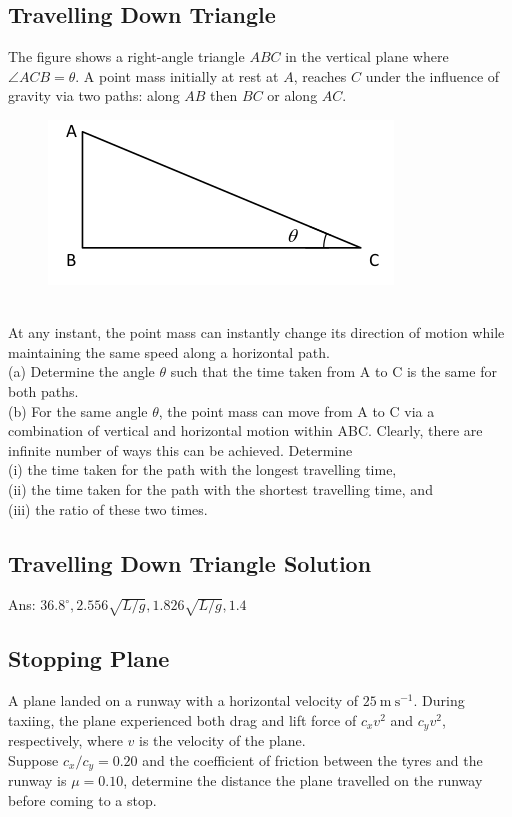\documentclass{article}
\begin{document}
\subsection{Travelling Down Triangle}
The figure shows a right-angle triangle $A B C$ in the vertical plane where $\angle A C B=\theta$. A point mass initially at rest at $A$, reaches $C$ under the influence of gravity via two paths: along $A B$ then $B C$ or along $A C$.\\[10pt]
\begin{figure}[h]
    \centering
\includegraphics[width=0.8\linewidth]{images/travellingdowntriangle.png}
\end{figure}\\
At any instant, the point mass can instantly change its direction of motion while maintaining the same speed along a horizontal path.\\[10pt]
(a) Determine the angle $\theta$ such that the time taken from $\mathrm{A}$ to $\mathrm{C}$ is the same for both paths.\\[5pt]
(b) For the same angle $\theta$, the point mass can move from $\mathrm{A}$ to $\mathrm{C}$ via a combination of vertical and horizontal motion within ABC. Clearly, there are infinite number of ways this can be achieved. Determine\\[5pt]
(i) the time taken for the path with the longest travelling time,\\[5pt]
(ii) the time taken for the path with the shortest travelling time, and\\[5pt]
(iii) the ratio of these two times.

\clearpage 
\subsection{Travelling Down Triangle Solution}
Ans: $36.8^{\circ}, 2.556 \sqrt{L / g}, 1.826 \sqrt{L / g}, 1.4$
\clearpage
\subsection{Stopping Plane}
A plane landed on a runway with a horizontal velocity of $25 \mathrm{~m} \mathrm{~s}^{-1}$. During taxiing, the plane experienced both drag and lift force of $c_x v^2$ and $c_y v^2$, respectively, where $v$ is the velocity of the plane.\\[10pt]
Suppose $c_x / c_y=0.20$ and the coefficient of friction between the tyres and the runway is $\mu=0.10$, determine the distance the plane travelled on the runway before coming to a stop.
\clearpage
\end{document}
